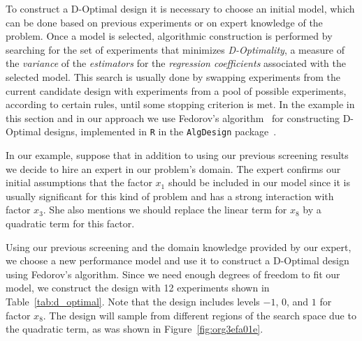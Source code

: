 \documentclass[conference]{IEEEtran}
\begin{document}
To construct a D-Optimal design it is necessary to choose an initial model,
which can be done based on previous experiments or on expert knowledge of the
problem. Once a model is selected, algorithmic construction is performed by
searching for the set of experiments that minimizes \emph{D-Optimality}, a measure of
the \emph{variance} of the \emph{estimators} for the \emph{regression coefficients} associated
with the selected model. This search is usually done by swapping experiments
from the current candidate design with experiments from a pool of possible
experiments, according to certain rules, until some stopping criterion is met.
In the example in this section and in our approach we use Fedorov's
algorithm~\cite{fedorov1972theory} for constructing D-Optimal designs,
implemented in \texttt{R} in the \texttt{AlgDesign} package~\cite{wheeler2014algdesign}.

In our example, suppose that in addition to using our previous screening results
we decide to hire an expert in our problem's domain. The expert confirms our
initial assumptions that the factor \(x_1\) should be included in our model since
it is usually significant for this kind of problem and has a strong interaction
with factor \(x_3\). She also mentions we should replace the linear term for \(x_8\)
by a quadratic term for this factor.

Using our previous screening and the domain knowledge provided by our expert, we
choose a new performance model and use it to construct a D-Optimal design using
Fedorov's algorithm. Since we need enough degrees of freedom to fit our model,
we construct the design with 12 experiments shown in Table~\ref{tab:d_optimal}.
Note that the design includes levels \(-1\), \(0\), and \(1\) for factor \(x_8\). The design
will sample from different regions of the search space due to the quadratic term,
as was shown in Figure~\ref{fig:org3efa01e}.
\end{document}
